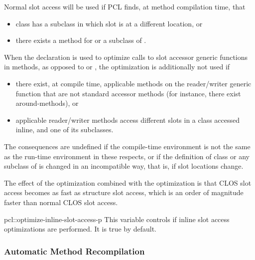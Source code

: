 Normal slot access will be used if PCL finds, at method compilation
time, that

\begin{itemize}
\item class  has a subclass in which slot  is at a
  different location, or

\item there exists a  method for
   or a subclass of .
\end{itemize}
  
When the declaration is used to optimize calls to slot accessor
generic functions in methods, as opposed to  or
, the optimization is additionally not used if

\begin{itemize}
\item there exist, at compile time, applicable methods on the
  reader/writer generic function that are not standard accessor
  methods (for instance, there exist around-methods), or
  
\item applicable reader/writer methods access different slots in a
  class accessed inline, and one of its subclasses.
\end{itemize}

The consequences are undefined if the compile-time environment is not
the same as the run-time environment in these respects, or if the
definition of class  or any subclass of  is
changed in an incompatible way, that is, if slot locations change.

The effect of the  optimization combined with the
 optimization is that CLOS slot access becomes as
fast as structure slot access, which is an order of magnitude faster
than normal CLOS slot access.

\begin{defvar}{pcl::}{optimize-inline-slot-access-p}
  This variable controls if inline slot access optimizations are
  performed.  It is true by default.
\end{defvar}



\subsubsection{Automatic Method Recompilation}
  
